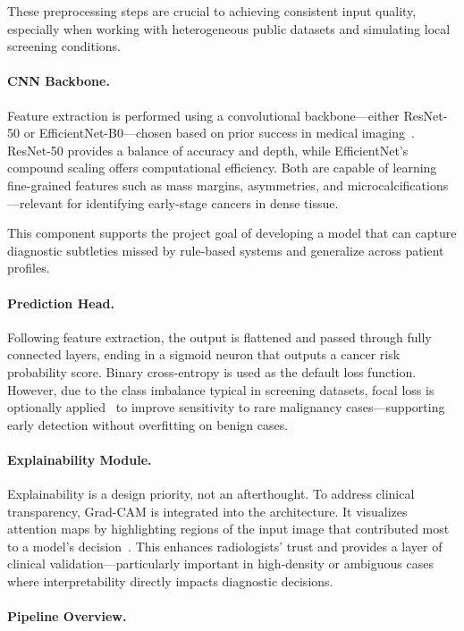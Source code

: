 \documentclass[12pt]{article}
\begin{document}
These preprocessing steps are crucial to achieving consistent input quality, especially when working with heterogeneous public datasets and simulating local screening conditions.

\paragraph{CNN Backbone.}
Feature extraction is performed using a convolutional backbone—either ResNet-50 or EfficientNet-B0—chosen based on prior success in medical imaging~\cite{1,7}. ResNet-50 provides a balance of accuracy and depth, while EfficientNet’s compound scaling offers computational efficiency. Both are capable of learning fine-grained features such as mass margins, asymmetries, and microcalcifications—relevant for identifying early-stage cancers in dense tissue.

This component supports the project goal of developing a model that can capture diagnostic subtleties missed by rule-based systems and generalize across patient profiles.

\paragraph{Prediction Head.}
Following feature extraction, the output is flattened and passed through fully connected layers, ending in a sigmoid neuron that outputs a cancer risk probability score. Binary cross-entropy is used as the default loss function. However, due to the class imbalance typical in screening datasets, focal loss is optionally applied~\cite{2} to improve sensitivity to rare malignancy cases—supporting early detection without overfitting on benign cases.

\paragraph{Explainability Module.}
Explainability is a design priority, not an afterthought. To address clinical transparency, Grad-CAM is integrated into the architecture. It visualizes attention maps by highlighting regions of the input image that contributed most to a model’s decision~\cite{5}. This enhances radiologists' trust and provides a layer of clinical validation—particularly important in high-density or ambiguous cases where interpretability directly impacts diagnostic decisions.

\paragraph{Pipeline Overview.}
\end{document}
